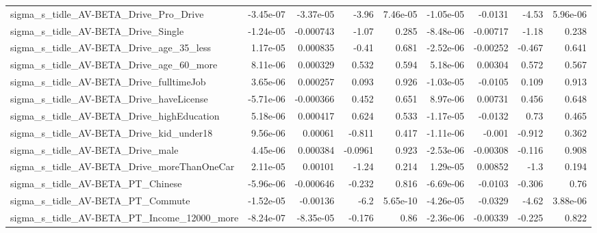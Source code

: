 \begin{tabular}{lrrrrrrrr}
sigma\_s\_tidle\_AV-BETA\_Drive\_Pro\_Drive              &   -3.45e-07 &    -3.37e-05 &    -3.96 & 7.46e-05 &  -1.05e-05 &     -0.0131 &        -4.53 &      5.96e-06 \\
sigma\_s\_tidle\_AV-BETA\_Drive\_Single                 &   -1.24e-05 &    -0.000743 &    -1.07 &    0.285 &  -8.48e-06 &    -0.00717 &        -1.18 &         0.238 \\
sigma\_s\_tidle\_AV-BETA\_Drive\_age\_35\_less            &    1.17e-05 &     0.000835 &    -0.41 &    0.681 &  -2.52e-06 &    -0.00252 &       -0.467 &         0.641 \\
sigma\_s\_tidle\_AV-BETA\_Drive\_age\_60\_more            &    8.11e-06 &     0.000329 &    0.532 &    0.594 &   5.18e-06 &     0.00304 &        0.572 &         0.567 \\
sigma\_s\_tidle\_AV-BETA\_Drive\_fulltimeJob            &    3.65e-06 &     0.000257 &    0.093 &    0.926 &  -1.03e-05 &     -0.0105 &        0.109 &         0.913 \\
sigma\_s\_tidle\_AV-BETA\_Drive\_haveLicense            &   -5.71e-06 &    -0.000366 &    0.452 &    0.651 &   8.97e-06 &     0.00731 &        0.456 &         0.648 \\
sigma\_s\_tidle\_AV-BETA\_Drive\_highEducation          &    5.18e-06 &     0.000417 &    0.624 &    0.533 &  -1.17e-05 &     -0.0132 &         0.73 &         0.465 \\
sigma\_s\_tidle\_AV-BETA\_Drive\_kid\_under18            &    9.56e-06 &      0.00061 &   -0.811 &    0.417 &  -1.11e-06 &      -0.001 &       -0.912 &         0.362 \\
sigma\_s\_tidle\_AV-BETA\_Drive\_male                   &    4.45e-06 &     0.000384 &  -0.0961 &    0.923 &  -2.53e-06 &    -0.00308 &       -0.116 &         0.908 \\
sigma\_s\_tidle\_AV-BETA\_Drive\_moreThanOneCar         &    2.11e-05 &      0.00101 &    -1.24 &    0.214 &   1.29e-05 &     0.00852 &         -1.3 &         0.194 \\
sigma\_s\_tidle\_AV-BETA\_PT\_Chinese                   &   -5.96e-06 &    -0.000646 &   -0.232 &    0.816 &  -6.69e-06 &     -0.0103 &       -0.306 &          0.76 \\
sigma\_s\_tidle\_AV-BETA\_PT\_Commute                   &   -1.52e-05 &     -0.00136 &     -6.2 & 5.65e-10 &  -4.26e-05 &     -0.0329 &        -4.62 &      3.88e-06 \\
sigma\_s\_tidle\_AV-BETA\_PT\_Income\_12000\_more         &   -8.24e-07 &    -8.35e-05 &   -0.176 &     0.86 &  -2.36e-06 &    -0.00339 &       -0.225 &         0.822 \\

\end{tabular}
